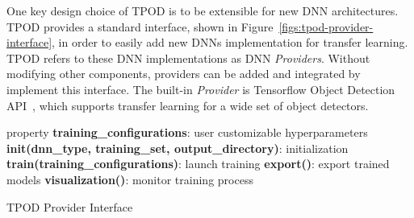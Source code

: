 One key design choice of TPOD is to be extensible for new DNN architectures.
TPOD provides a standard interface, shown in
Figure~\ref{figs:tpod-provider-interface}, in order to easily add new DNNs
implementation for transfer learning. TPOD refers to these DNN implementations
as DNN \textit{Providers}. Without modifying other components, providers can be
added and integrated by implement this interface. The built-in \textit{Provider}
is Tensorflow Object Detection API~\cite{tfod2019}, which supports transfer
learning for a wide set of object detectors. 


\begin{algorithm} 
\SetAlgoLined
 property \textbf{training\_configurations}: user customizable hyperparameters\;
 \textbf{init(dnn\_type, training\_set, output\_directory)}: initialization\;
 \textbf{train(training\_configurations)}: launch training\;
 \textbf{export()}: export trained models\;
 \textbf{visualization()}: monitor training process\;
\caption{TPOD Provider Interface}
\label{figs:tpod-provider-interface}
\end{algorithm}